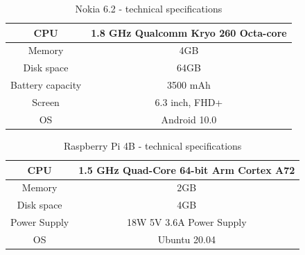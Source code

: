 \begin{table}[t]
\centering
\caption{Nokia 6.2 - technical specifications}
\label{table1}
\begin{tabular}{|c|c|}
\hline
CPU & 1.8 GHz Qualcomm Kryo 260 Octa-core\\
\hline

Memory & 4GB \\ 
\hline

Disk space &  64GB \\
\hline

Battery capacity &  3500 mAh \\
\hline

Screen &  6.3 inch, FHD+ \\
\hline

OS & Android 10.0 \\
\hline

\end{tabular}
\label{table_MAP}
\end{table}

\begin{table}[t]
\centering
\caption{{\color{blue}Raspberry Pi 4B - technical specifications}}
\label{table1}
\begin{tabular}{|c|c|}
\hline
{\color{blue}CPU} & {\color{blue}1.5 GHz Quad-Core 64-bit Arm Cortex A72}\\
\hline

{\color{blue}Memory} & {\color{blue}2GB} \\ 
\hline

{\color{blue}Disk space} &  {\color{blue}4GB} \\
\hline

{\color{blue}Power Supply} &  {\color{blue}18W 5V 3.6A Power Supply} \\
\hline

{\color{blue}OS} &  {\color{blue}Ubuntu 20.04} \\
\hline


\end{tabular}
\label{table_MAP}
\end{table}

